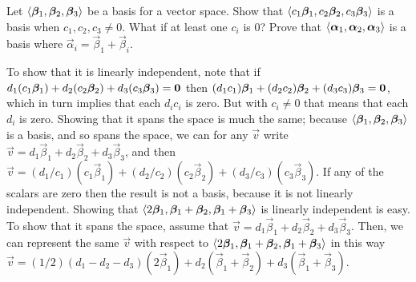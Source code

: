 
\begin{Exercise}[
name={},
title={}, 
difficulty=0,
origin={\cite{JH}}]
Let \( \langle\bm{\beta}_1,\bm{\beta}_2,\bm{\beta}_3\rangle \)
be a basis for a vector space.
\Question Show that 
\( \langle c_1\bm{\beta}_1,c_2\bm{\beta}_2,c_3\bm{\beta}_3\rangle \)
is a basis when \( c_1, c_2, c_3\neq 0 \).
What if at least one \( c_i \) is $0$?
\Question Prove that
\( \langle\bm{\alpha}_1,\bm{\alpha}_2,\bm{\alpha}_3\rangle \)
is a basis where \( \vec{\alpha}_i=\vec{\beta}_1+\vec{\beta}_i \).
\end{Exercise}

\begin{Answer}
\Question To show that it is linearly independent, note that if
\( d_1(c_1\bm{\beta}_1)+d_2(c_2\bm{\beta}_2)+d_3(c_3\bm{\beta}_3)
               =\bm{0} \)
 then
\( (d_1c_1)\bm{\beta}_1+(d_2c_2)\bm{\beta}_2+(d_3c_3)\bm{\beta}_3
               =\bm{0} \), which in turn 
implies that each \( d_ic_i \) is zero.
But with \( c_i\neq 0 \) that means that each \( d_i \) is zero.
Showing that it spans the space is much the same; 
because $\langle\bm{\beta}_1,\bm{\beta}_2,\bm{\beta}_3\rangle$
is a basis, and so spans the space, we can for any $\vec{v}$ write  
\( \vec{v}=d_1\vec{\beta}_1+d_2\vec{\beta}_2+d_3\vec{\beta}_3 \),
and then
\( \vec{v}=(d_1/c_1)(c_1\vec{\beta}_1)
+(d_2/c_2)(c_2\vec{\beta}_2)+(d_3/c_3)(c_3\vec{\beta}_3) \).
If any of the scalars are zero then the result is not a basis,
because it is not linearly independent.
\Question Showing that 
$\langle2\bm{\beta}_1,\bm{\beta}_1+\bm{\beta}_2,
\bm{\beta}_1+\bm{\beta}_3\rangle$ is linearly independent is easy. 
To show that it spans the space, assume that
\( \vec{v}=d_1\vec{\beta}_1+d_2\vec{\beta}_2+d_3\vec{\beta}_3 \).
Then, we can represent the same \( \vec{v} \) with respect to
\( \langle2\bm{\beta}_1,\bm{\beta}_1+\bm{\beta}_2,
                         \bm{\beta}_1+\bm{\beta}_3\rangle \)
           in this way
           $\vec{v}=(1/2)(d_1-d_2-d_3)(2\vec{\beta}_1)
           +d_2(\vec{\beta}_1+\vec{\beta}_2)+d_3(\vec{\beta}_1+\vec{\beta}_3)$.

\end{Answer}
